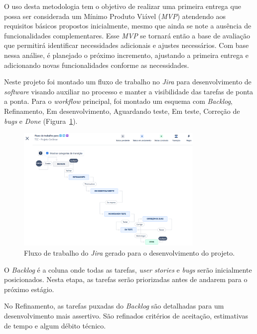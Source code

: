 O uso desta metodologia tem o objetivo de realizar uma primeira entrega que possa ser considerada um 
Mínimo Produto Viável (\textit{MVP}) atendendo aos requisitos básicos propostos inicialmente, mesmo que ainda 
se note a ausência de funcionalidades complementares. Esse \textit{MVP} se tornará então a base de avaliação que 
permitirá identificar necessidades adicionais e ajustes necessários. Com base nessa análise, é planejado 
o próximo incremento, ajustando a primeira entrega e adicionando novas funcionalidades conforme as necessidades.

Neste projeto foi montado um fluxo de trabalho no \textit{Jira} para desenvolvimento de \textit{software} visando 
auxiliar no processo e manter a visibilidade das tarefas de ponta a ponta. Para o \textit{workflow} principal, 
foi montado um esquema com \textit{Backlog}, Refinamento, Em desenvolvimento, Aguardando teste, Em teste, 
Correção de \textit{bugs} e \textit{Done} (Figura~\ref{fig:fluxoJira}).

\begin{figure}[htb]
    \centering
    \includegraphics[width=0.8\textwidth]{imagens/fluxoJira.png}
    \caption{Fluxo de trabalho do \textit{Jira} gerado para o desenvolvimento do projeto.}
    \label{fig:fluxoJira}
\end{figure} 

O \textit{Backlog} é a coluna onde todas as tarefas, \textit{user stories} e \textit{bugs} serão inicialmente 
posicionados. Nesta etapa, as tarefas serão priorizadas antes de andarem para o próximo estágio.

No Refinamento, as tarefas puxadas do \textit{Backlog} são detalhadas para um desenvolvimento 
mais assertivo. São refinados critérios de aceitação, estimativas de tempo e algum débito técnico.

